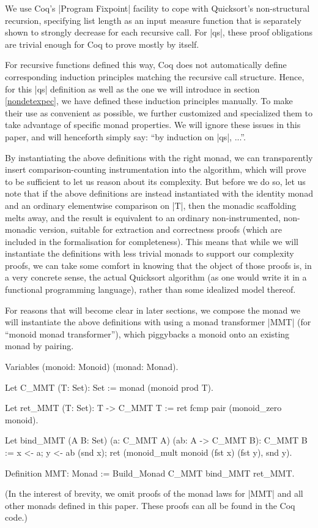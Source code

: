 \documentclass[runningheads]{llncs}
\begin{document}
We use Coq's |Program Fixpoint| facility \cite{subsetcoercions} to cope with Quicksort's non-structural recursion, specifying list length as an input measure function that is separately shown to strongly decrease for each recursive call. For |qs|, these proof obligations are trivial enough for Coq to prove mostly by itself.

For recursive functions defined this way, Coq does not automatically define corresponding induction principles matching the recursive call structure. Hence, for this |qs| definition as well as the one we will introduce in section \ref{nondetexpec}, we have defined these induction principles manually. To make their use as convenient as possible, we further customized and specialized them to take advantage of specific monad properties. We will ignore these issues in this paper, and will henceforth simply say: ``by induction on |qs|, ...''.

By instantiating the above definitions with the right monad, we can transparently insert comparison-counting instrumentation into the algorithm, which will prove to be sufficient to let us reason about its complexity. But before we do so, let us note that if the above definitions are instead instantiated with the identity monad and an ordinary elementwise comparison on |T|, then the monadic scaffolding melts away, and the result is equivalent to an ordinary non-instrumented, non-monadic version, suitable for extraction and correctness proofs (which are included in the formalisation for completeness). This means that while we will instantiate the definitions with less trivial monads to support our complexity proofs, we can take some comfort in knowing that the object of those proofs is, in a very concrete sense, the actual Quicksort algorithm (as one would write it in a functional programming language), rather than some idealized model thereof.

For reasons that will become clear in later sections, we compose the monad we will instantiate the above definitions with using a monad transformer \cite{monadtrans} |MMT| (for ``monoid monad transformer''), which piggybacks a monoid onto an existing monad by pairing.

\begin{code}
  Variables (monoid: Monoid) (monad: Monad).

  Let C_MMT (T: Set): Set := monad (monoid prod T).

  Let ret_MMT (T: Set): T -> C_MMT T := ret fcmp pair (monoid_zero monoid).

  Let bind_MMT (A B: Set) (a: C_MMT A) (ab: A -> C_MMT B): C_MMT B :=
    x <- a; y <- ab (snd x); ret (monoid_mult monoid (fst x) (fst y), snd y).

  Definition MMT: Monad := Build_Monad C_MMT bind_MMT ret_MMT.
\end{code}
(In the interest of brevity, we omit proofs of the monad laws for |MMT| and all other monads defined in this paper. These proofs can all be found in the Coq code.)
\end{document}
